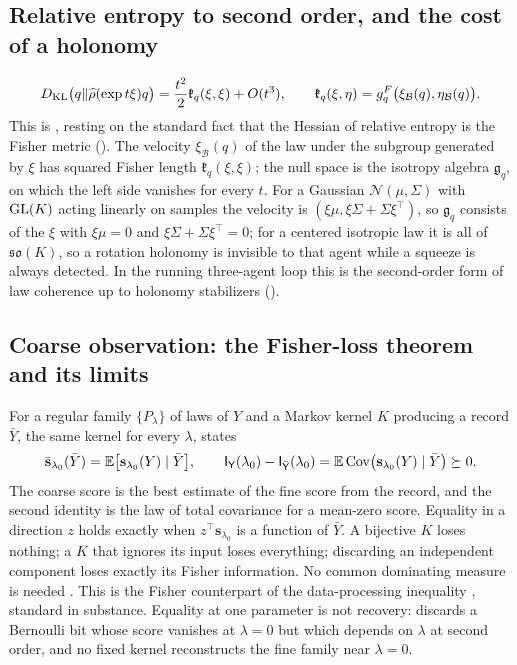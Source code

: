 \subsection{Relative entropy to second order, and the cost of a holonomy}
\label{comp:ch07-formulas-orbit}

\[
D_{\mathrm{KL}}\bigl(q\Vert\widehat\rho(\exp t\xi)q\bigr)=\frac{t^2}{2}\mathfrak k_q(\xi,\xi)+O(t^3),
\qquad
\mathfrak k_q(\xi,\eta)=g^F_q\bigl(\xi_{\mathcal B}(q),\eta_{\mathcal B}(q)\bigr).
\]
This is , resting on the standard fact \citep{AmariNagaoka2000} that
the Hessian of relative entropy is the Fisher metric (). The
velocity $\xi_{\mathcal B}(q)$ of the law under the subgroup generated by $\xi$ has squared Fisher
length $\mathfrak k_q(\xi,\xi)$; the null space is the isotropy algebra $\mathfrak g_q$, on which the
left side vanishes for every $t$. For a Gaussian $\mathcal N(\mu,\Sigma)$ with $\mathrm{GL}(K)$ acting
linearly on samples the velocity is $(\xi\mu,\xi\Sigma+\Sigma\xi^\top)$, so $\mathfrak g_q$ consists of
the $\xi$ with $\xi\mu=0$ and $\xi\Sigma+\Sigma\xi^\top=0$; for a centered isotropic law it is all of
$\mathfrak{so}(K)$, so a rotation holonomy is invisible to that agent while a squeeze is always
detected. In the running three-agent loop this is the second-order form of law coherence up to
holonomy stabilizers ().

\subsection{Coarse observation: the Fisher-loss theorem and its limits}
\label{comp:ch07-formulas-contraction}

For a regular family $\{P_\lambda\}$ of laws of $Y$ and a Markov kernel $K$ producing a record
$\bar Y$, the same kernel for every $\lambda$,  states
\[
\bar{\mathbf s}_{\lambda_0}(\bar Y)=\mathbb E\bigl[\mathbf s_{\lambda_0}(Y)\mid\bar Y\bigr],
\qquad
\mathsf I_{\mathsf Y}(\lambda_0)-\mathsf I_{\bar{\mathsf Y}}(\lambda_0)
=\mathbb E\operatorname{Cov}\bigl(\mathbf s_{\lambda_0}(Y)\mid\bar Y\bigr)\succeq0 .
\]
The coarse score is the best estimate of the fine score from the record, and the second identity is
the law of total covariance for a mean-zero score. Equality in a direction $z$ holds exactly when
$z^\top\mathbf s_{\lambda_0}$ is a function of $\bar Y$. A bijective $K$ loses nothing; a $K$ that
ignores its input loses everything; discarding an independent component loses exactly its Fisher
information. No common dominating measure is needed \citep{Pollard2013}. This is the Fisher
counterpart of the data-processing inequality \citep{CoverThomas2006}, standard in substance.
Equality at one parameter is not recovery:  discards a
Bernoulli bit whose score vanishes at $\lambda=0$ but which depends on $\lambda$ at second order, and
no fixed kernel reconstructs the fine family near $\lambda=0$.

